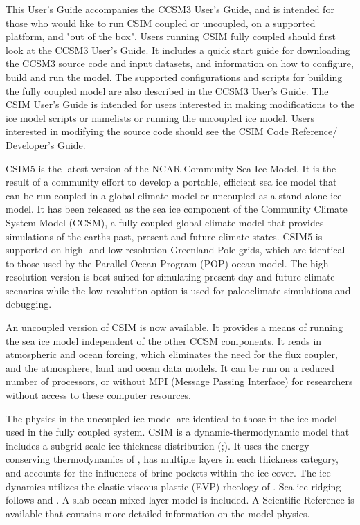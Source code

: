 
This User's Guide accompanies the CCSM3 User's Guide, and is intended
for those who would like to run CSIM coupled or uncoupled, on a supported
platform, and "out of the box".  Users running CSIM fully coupled should first
look at the CCSM3 User's Guide.  It includes a quick start guide for downloading
the CCSM3 source code and input datasets, and information on how to configure,
build and run the model.  The supported configurations and scripts for building
the fully coupled model are also described in the CCSM3 User's Guide.  The CSIM
User's Guide is intended for users interested in making modifications to the
ice model scripts or namelists or running the uncoupled ice model.  Users
interested in modifying the source code should see the CSIM Code Reference/
Developer's Guide.

CSIM5 is the latest version of the NCAR Community Sea Ice Model.  It is the
result of a community effort to develop a portable, efficient sea ice model
that can be run coupled in a global climate model or uncoupled as a stand-alone
ice model. It has been released as the sea ice component of the Community
Climate System Model (CCSM), a fully-coupled global climate model that
provides simulations of the earths past, present and future climate states.
CSIM5 is supported on high- and low-resolution Greenland Pole
grids, which are identical to those used by the Parallel Ocean Program (POP)
ocean model.  The high resolution version is best suited for simulating 
present-day and future climate scenarios while the low resolution option is
used for paleoclimate simulations and debugging.

An uncoupled version of CSIM is now available.  It provides a means of running
the sea ice model independent of the other CCSM components.  It reads in
atmospheric and ocean forcing, which eliminates the need for the flux coupler,
and the atmosphere, land and ocean data models.  It can be run on a reduced
number of processors, or without MPI (Message Passing Interface) for researchers
without access to these computer resources.

The physics in the uncoupled ice model are identical to those in the
ice model used in the fully coupled system.  CSIM is a dynamic-thermodynamic
model that includes a subgrid-scale ice thickness distribution
(\cite{bitz01};\cite{lips01}).  It uses the energy conserving thermodynamics
of \cite{bitz99}, has multiple layers in each thickness category, and accounts
for the influences of brine pockets within the ice cover.  The ice dynamics
utilizes the elastic-viscous-plastic (EVP) rheology of \cite{hunk97}.  Sea ice
ridging follows \cite{roth75b} and \cite{thor75}.  A slab ocean mixed layer model
is included.  A Scientific Reference is available that contains more detailed
information on the model physics. 

